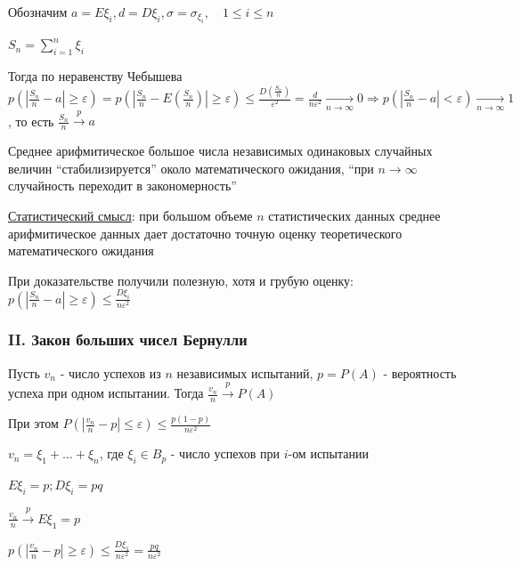 \documentclass[12pt]{article}
\begin{document}
    \begin{MyProof}
        Обозначим $a = E\xi_i, d = D\xi_i, \sigma = \sigma_{\xi_i}, \quad 1 \leq i \leq n$

        $S_n = \sum_{i = 1}^n \xi_i$

        Тогда по неравенству Чебышева $p\left(\left|\frac{S_n}{n} - a\right| \geq \varepsilon\right) = p\left(\left|\frac{S_n}{n} - E\left(\frac{S_n}{n}\right)\right| \geq \varepsilon\right) \leq
        \frac{D\left(\frac{S_n}{n}\right)}{\varepsilon^2} = \frac{d}{n\varepsilon^2} \underset{n \to \infty}{\longrightarrow} 0 \Longrightarrow p\left(|\frac{S_n}{n} - a| < \varepsilon\right) \underset{n \to \infty}{\longrightarrow} 1$,
        то есть $\frac{S_n}{n} \overset{p}{\longrightarrow} a$
    \end{MyProof}

    Среднее арифмитическое большое числа независимых одинаковых случайных величин \enquote{стабилизируется} около математического ожидания,
    \enquote{при $n \to \infty$ случайность переходит в закономерность}

    \underline{Статистический смысл}: при большом объеме $n$ статистических данных среднее арифмитическое данных
    дает достаточно точную оценку теоретического математического ожидания

    \Nota При доказательстве получили полезную, хотя и грубую оценку: $p\left(\left|\frac{S_n}{n} - a\right| \geq \varepsilon\right) \leq \frac{D\xi_i}{n\varepsilon^2}$

    \subsubsection{II. Закон больших чисел Бернулли}

    \hypertarget{lawofbignumbersbernoulli2}{}

    \begin{MyTheorem}
        \Ths Пусть $v_n$ - число успехов из $n$ независимых испытаний, $p = P(A)$ - вероятность успеха при одном испытании.
        Тогда $\frac{v_n}{n} \overset{p}{\longrightarrow} P(A)$
    \end{MyTheorem}

    При этом $P\left(\left|\frac{v_n}{n} - p\right| \leq \varepsilon\right) \leq \frac{p(1 - p)}{n\varepsilon^2}$

    \begin{MyProof}
        $v_n = \xi_1 + \dots + \xi_n$, где $\xi_i \in B_p$ - число успехов при $i$-ом испытании

        $E\xi_i = p; D\xi_i = pq$

        $\frac{v_n}{n} \overset{p}{\longrightarrow} E\xi_1 = p$

        $p\left(\left|\frac{v_n}{n} - p\right| \geq \varepsilon\right) \leq \frac{D\xi_1}{n\varepsilon^2} = \frac{pq}{n\varepsilon^2}$
    \end{MyProof}
\end{document}
